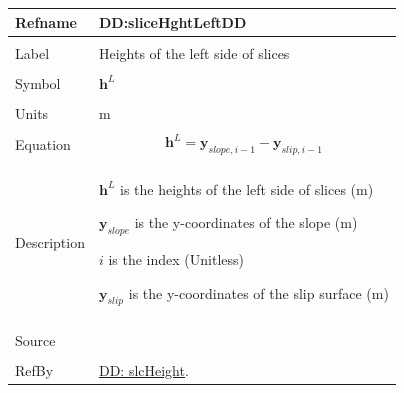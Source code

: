 \documentclass[12pt]{article}
\begin{document}
\noindent \begin{minipage}{\textwidth}
\begin{tabular}{p{} p{}}
\toprule \textbf{Refname} & \textbf{DD:sliceHghtLeftDD}
\label{DD:sliceHghtLeftDD}
\\ \midrule \\
Label & Heights of the left side of slices
\\ \midrule \\
Symbol & ${\mathbf{h}^{L}}$
\\ \midrule \\
Units & m
\\ \midrule \\
Equation & \begin{displaymath}
           {\mathbf{h}^{L}}={\mathbf{y}_{slope,i-1}}-{\mathbf{y}_{slip,i-1}}
           \end{displaymath}
\\ \midrule \\
Description & \begin{symbDescription}
              \item{${\mathbf{h}^{L}}$ is the heights of the left side of slices (m)}
              \item{${\mathbf{y}_{slope}}$ is the y-coordinates of the slope (m)}
              \item{$i$ is the index (Unitless)}
              \item{${\mathbf{y}_{slip}}$ is the y-coordinates of the slip surface (m)}
              \end{symbDescription}
\\ \midrule \\
Source & 
\\ \midrule \\
RefBy & \hyperref[DD:slcHeight]{DD: slcHeight}.
\\ \bottomrule \end{tabular}
\end{minipage}
\par~
\end{document}
